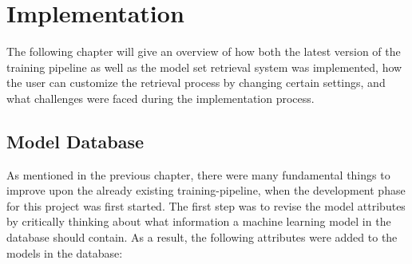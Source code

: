 \chapter{Implementation}\label{chap:implementation}

The following chapter will give an overview of how both the latest version of the training pipeline as well as the model set retrieval system was implemented, how the user can customize the retrieval process by changing certain settings, and what challenges were faced during the implementation process.



\section{Model Database}

As mentioned in the previous chapter, there were many fundamental things to improve upon the already existing training-pipeline, when the development phase for this project was first started. The first step was to revise the model attributes by critically thinking about what information a machine learning model in the database should contain. As a result, the following attributes were added to the models in the database:

